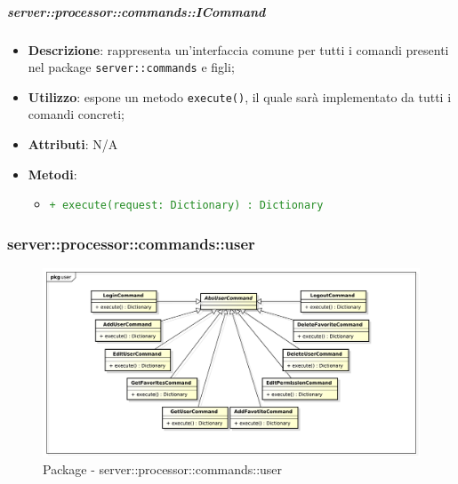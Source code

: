       \subparagraph{server::processor::commands::ICommand} %
      \label{subp:bdsm_app_server_processor_commands_icommand}
      \begin{itemize}
        \item \textbf{Descrizione}: rappresenta un'interfaccia comune per tutti i comandi presenti nel package \texttt{server::commands} e figli;
        \item \textbf{Utilizzo}: espone un metodo \texttt{execute()}, il quale sarà implementato da tutti i comandi concreti;
    \item \textbf{Attributi}: N/A
    \item \textbf{Metodi}:
          \begin{itemize}
              \item \textcolor{forestgreen}{\texttt{+ execute(request: Dictionary) : Dictionary}}
          \end{itemize}
      \end{itemize}


      \subsubsection{server::processor::commands::user} %
      \label{ssub:bdsm_app_server_processor_commands_user}
      \begin{figure}[!htbp]
        \centering
        \centerline{\includegraphics[scale=0.5]{./images/server/user.pdf}}
        \caption{Package - server::processor::commands::user}
      \end{figure}

